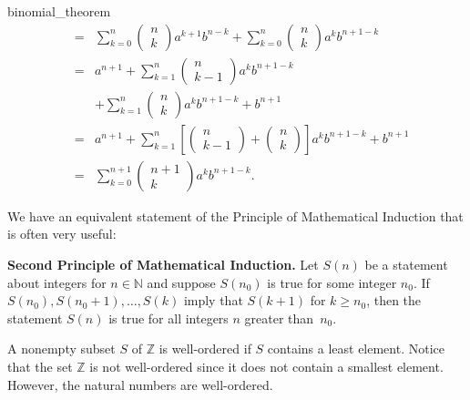 \begin{example}{binomial_theorem}
\begin{eqnarray*}
&  = &
\sum_{k = 0}^{n} \left( \begin{array}{c} n \\ k
\end{array} \right) a^{k + 1} b^{n - k}   +
\sum_{k = 0}^{n} \left( \begin{array}{c} n \\ k
\end{array} \right) a^k b^{n + 1 - k} \\
&  = &
a^{n + 1} + \sum_{k = 1}^{n} \left( \begin{array}{c} n \\ k - 1
\end{array} \right) a^{k} b^{n + 1 - k} \\
&  & +
\sum_{k = 1}^{n} \left( \begin{array}{c} n \\ k
\end{array} \right) a^k b^{n + 1 - k} + b^{n + 1}\\
&  = &
a^{n + 1} + \sum_{k = 1}^{n} \left[ \left( \begin{array}{c} n \\
k - 1 \end{array} \right)
+
\left( \begin{array}{c} n \\ k \end{array} \right) \right]
a^k b^{n + 1 - k} + b^{n + 1} \\
&  = &
\sum_{k = 0}^{n + 1}   \left( \begin{array}{c} n + 1 \\ k
\end{array} \right) a^k b^{n + 1- k}.
\end{eqnarray*}
\end{example}
 
We have an equivalent statement of the Principle of Mathematical Induction that is often very useful:
 
\medskip

\noindent 
{\bf Second Principle of Mathematical Induction.}  
Let $S(n)$ be a statement about integers for  $n \in {\mathbb N}$ and suppose $S(n_0)$ is true for some integer $n_0$.  If $S(n_0), S(n_0 + 1), \ldots, S(k)$ imply that $S(k + 1)$ for $k \geq n_0$, then the statement $S(n)$ is true for all integers $n$ greater than~$n_0$.   
 
\medskip

A  nonempty subset $S$ of ${\mathbb Z}$ is {\bfi well-ordered\/} if $S$ contains a least element.  Notice that the set ${\mathbb Z}$ is not well-ordered since it does not contain a smallest element.  However, the natural numbers are well-ordered. 
 
